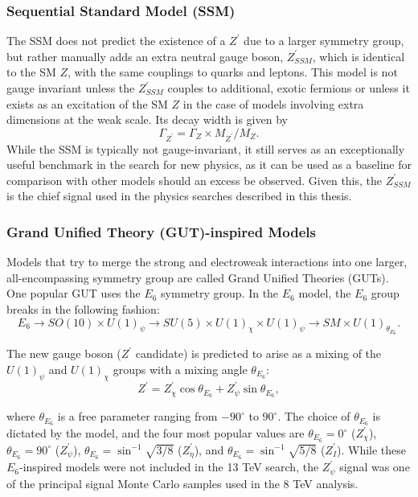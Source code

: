 \subsubsection{Sequential Standard Model (SSM)}

The SSM does not predict the existence of a $Z^{\prime}$ due to a larger symmetry group, but rather manually adds an extra neutral gauge boson, $Z^{\prime}_{SSM}$, which is identical to the SM $Z$, with the same couplings to quarks and leptons. This model is not gauge invariant unless the $Z^{\prime}_{SSM}$ couples to additional, exotic fermions or unless it exists as an excitation of the SM $Z$ in the case of models involving extra dimensions at the weak scale. Its decay width is given by 
\begin{equation}
\Gamma_{Z^{\prime}} = \Gamma_Z \times M_{Z^{\prime}}/M_{Z}.
\end{equation}
\noindent While the SSM is typically not gauge-invariant, it still serves as an exceptionally useful benchmark in the search for new physics, as it can be used as a baseline for comparison with other models should an excess be observed\cite{SSM}. Given this, the $Z^{\prime}_{SSM}$ is the chief signal used in the physics searches described in this thesis. 

\subsubsection{Grand Unified Theory (GUT)-inspired Models}

Models that try to merge the strong and electroweak interactions into one larger, all-encompassing symmetry group are called Grand Unified Theories (GUTs). One popular GUT uses the $E_6$ symmetry group. In the $E_6$ model, the $E_6$ group breaks in the following fashion:
\begin{equation}
E_6 \to SO(10) \times U(1)_\psi \to SU(5) \times U(1)_\chi \times U(1)_\psi \to SM \times U(1)_{\theta_{E_6}}.
\end{equation}

\noindent The new gauge boson ($Z^\prime$ candidate) is predicted to arise as a mixing of the $U(1)_\psi$ and $U(1)_\chi$ groups with a mixing angle $\theta_{E_6}$:
\begin{equation}
Z^{\prime} = Z^\prime_\chi \cos{\theta_{E_6}} + Z^\prime_\psi \sin{\theta_{E_6}},
\end{equation}

\noindent where $\theta_{E_6}$ is a free parameter ranging from $-90^{\circ}$ to $90^{\circ}$. The choice of $\theta_{E_6}$ is dictated by the model, and the four most popular values are $\theta_{E_6} = 0^{\circ}$ ($Z^\prime_\chi$), $\theta_{E_6} = 90^{\circ}$ ($Z^\prime_\psi$), $\theta_{E_6} = \sin^{-1}{\sqrt{3/8}}$ ($Z^\prime_\eta$), and $\theta_{E_6} = \sin^{-1}{\sqrt{5/8}}$ ($Z^\prime_I$)\cite{E6}. While these $E_6$-inspired models were not included in the 13 TeV search, the $Z^\prime_\psi$ signal was one of the principal signal Monte Carlo samples used in the 8 TeV analysis.